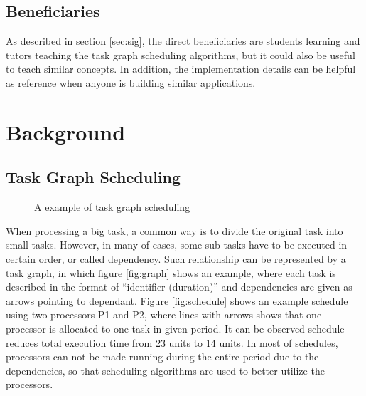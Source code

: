 \documentclass[a4paper,11pt]{article}
\begin{document}
\subsection{Beneficiaries}

As described in section \ref{sec:sig}, the direct beneficiaries are students learning and tutors teaching the task graph scheduling algorithms, but it could also be useful to teach similar concepts. In addition, the implementation details can be helpful as reference when anyone is building similar applications. 

\section{Background}

\subsection{Task Graph Scheduling} \label{sec:tgs}

\begin{figure}[htpb]
    \centering
     \hspace{2em}
    \caption{A example of task graph scheduling}
    \label{fig:example}
\end{figure}

When processing a big task, a common way is to divide the original task into small tasks. However, in many of cases, some sub-tasks have to be executed in certain order, or called dependency. Such relationship can be represented by a task graph, in which figure \ref{fig:graph} shows an example, where each task is described in the format of ``identifier (duration)'' and dependencies are given as arrows pointing to dependant. Figure \ref{fig:schedule} shows an example schedule using two processors P1 and P2, where lines with arrows shows that one processor is allocated to one task in given period. It can be observed schedule reduces total execution time from 23 units to 14 units. In most of schedules, processors can not be made running during the entire period due to the dependencies, so that scheduling algorithms are used to better utilize the processors.
\end{document}
